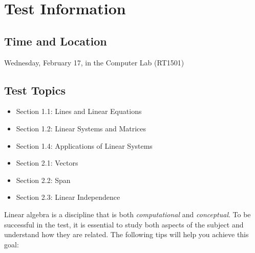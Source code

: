 \documentclass[12pt]{article}
\begin{document}
\sffamily

\section{Test Information}

\subsection{Time and Location}

\begin{center}
{\Large
Wednesday, February 17, in the Computer Lab (RT1501)
}
\end{center}

\subsection{Test Topics}

\begin{itemize}
\item Section 1.1: Lines and Linear Equations
\item Section 1.2: Linear Systems and Matrices
\item Section 1.4: Applications of Linear Systems
\item Section 2.1: Vectors
\item Section 2.2: Span
\item Section 2.3: Linear Independence
\end{itemize}

Linear algebra is a discipline that is both \emph{computational} and \emph{conceptual}. To be successful in the test, it is essential to study both aspects of the subject and understand how they are related. The following tips will help you achieve this goal:
\end{document}
